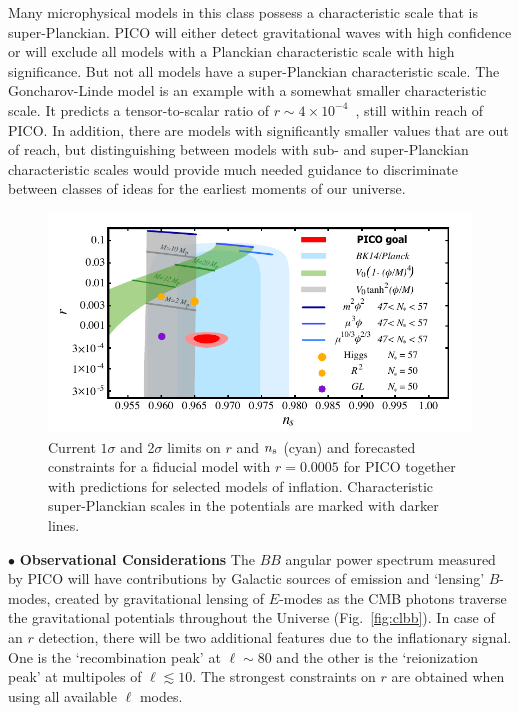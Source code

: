 \documentclass[PICOReport.tex]{subfiles}
\begin{document}
Many microphysical models in this class possess a characteristic scale that is super-Planckian. PICO will either detect gravitational waves with high confidence or will exclude all models with a Planckian characteristic scale with high significance. But not all models have a super-Planckian characteristic scale. The Goncharov-Linde model is an example with a somewhat smaller characteristic scale. It predicts a tensor-to-scalar ratio of $r\sim 4\times 10^{-4}$~\cite{Goncharov:1983mw}, still within reach of PICO. In addition, there are models with significantly smaller values that are out of reach, but distinguishing between models with sub- and super-Planckian characteristic scales would provide much needed guidance to discriminate between classes of ideas for the earliest moments of our universe.


\begin{figure}[!thb]
\parbox{4.5in}{\centerline{
\includegraphics[width=4.5in]{images/nsrlabeledrp0005_PICOv4p1.pdf}}}
\parbox{1.8in}{
\caption{\captiontext  Current $1\sigma$ and 2$\sigma$ limits on $r$ and $n_{\rm s}$ (cyan) and forecasted constraints for a fiducial model with $r = 0.0005$ for PICO together with predictions for selected models of inflation. Characteristic super-Planckian scales in the potentials are marked with darker lines. }
\label{fig:nsr}}
\end{figure}

\noindent$\bullet$ {\bf Observational Considerations} \hspace{0.1in} The $BB$ angular power spectrum measured by PICO will have contributions by Galactic sources of emission and `lensing' $B$-modes, created by gravitational lensing of $E$-modes as the CMB photons traverse the gravitational potentials throughout the Universe (Fig.~\ref{fig:clbb}). In case of an $r$ detection, there will be two additional features due to the inflationary signal. One is the `recombination peak' at $\ell \sim 80$ and the other is the `reionization peak' at multipoles of $\ell\lesssim 10$. The strongest constraints on $r$ are obtained when using all available $\ell$ modes.
\end{document}
